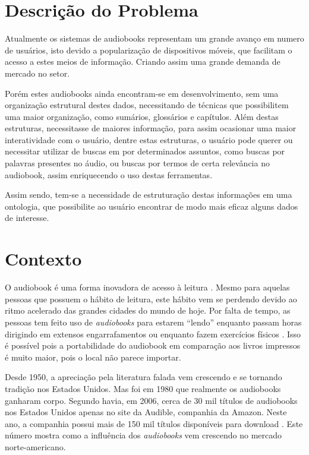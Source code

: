 \section{Descrição do Problema}
Atualmente os sistemas de audiobooks representam um grande avanço em numero de usuários, isto devido a popularização de dispositivos móveis, que facilitam o acesso a estes meios de informação. Criando assim uma grande demanda de mercado no setor.

Porém estes audiobooks ainda encontram-se em desenvolvimento, sem uma organização estrutural destes dados, necessitando de técnicas que possibilitem uma maior organização, como sumários, glossários e capítulos. Além destas estruturas, necessitasse de maiores informação, para assim ocasionar uma maior interatividade com o usuário, dentre estas estruturas, o usuário pode querer ou necessitar utilizar de buscas em por determinados assuntos, como buscas por palavras presentes no áudio, ou buscas por termos de certa relevância no audiobook, assim enriquecendo o uso destas ferramentas.

Assim sendo, tem-se a necessidade de estruturação destas informações em uma ontologia, que possibilite ao usuário encontrar de modo mais eficaz alguns dados de interesse. 

\section{Contexto}

O audiobook é uma forma inovadora de acesso à leitura \cite{audiobooksuporte}. Mesmo para aquelas pessoas que possuem o hábito de leitura, este hábito vem se perdendo devido ao ritmo acelerado das grandes cidades do mundo de hoje. Por falta de tempo, as pessoas tem feito uso de \textit{audiobooks} para estarem ``lendo'' enquanto passam horas dirigindo em extensos engarrafamentos ou enquanto fazem exercícios físicos \cite{audiobookinovacao}. Isso é possível pois a portabilidade do audiobook em comparação aos livros impressos é muito maior, pois o local não parece importar.

Desde 1950, a apreciação pela literatura falada vem crescendo e se tornando tradição nos Estados Unidos. Mas foi em 1980 que realmente os audiobooks ganharam corpo. Segundo \cite{teixeira} havia, em 2006, cerca de 30 mil títulos de audiobooks nos Estados Unidos apenas no site da Audible, companhia da Amazon. Neste ano, a companhia possui mais de 150 mil títulos disponíveis para download \cite{audible}. Este número mostra como a influência dos \textit{audiobooks} vem crescendo no mercado norte-americano.

